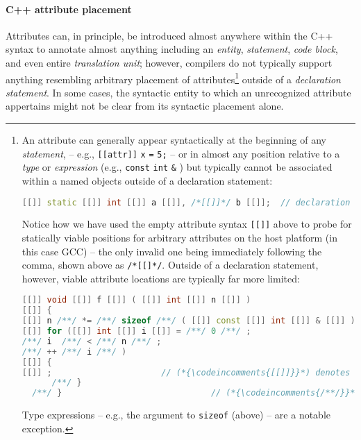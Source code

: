 \documentclass[twoside,10pt,letterpaper,usenames]{newstyle-PearsonGeneric-7-38}
\newcommand{\codeincomments}{\color{skyblue}\ttfamily}
\begin{document}
\paragraph[C++ attribute placement]{C++ attribute placement}\label{c++-attribute-placement}

Attributes can, in principle, be introduced almost anywhere within the
C++ syntax to annotate almost anything including an \emph{entity},
\emph{statement}, \emph{code block}, and even entire \emph{translation
unit}; however, compilers do not typically support anything resembling
arbitrary placement of attributes{\cprotect\footnote{An attribute can
generally appear syntactically at the beginning of any
\emph{statement}, -- e.g., \texttt{[[attr]]} \texttt{x} \texttt{=}
\texttt{5;} -- or in almost any position relative to a \emph{type} or
\emph{expression} (e.g., \texttt{const} \texttt{int} \texttt{\&} ) but
typically cannot be associated within a named objects outside of a
declaration statement:

\begin{lstlisting}[language=C++, basicstyle={\ttfamily\footnotesize}]
[[]] static [[]] int [[]] a [[]], /*[[]]*/ b [[]];  // declaration statement
\end{lstlisting}


Notice how we have used the empty attribute syntax \texttt{[[]]} above
to probe for statically viable positions for arbitrary attributes on
the host platform (in this case GCC) -- the only invalid one being
immediately following the comma, shown above as \texttt{/*[[]*/}.
Outside of a declaration statement, however, viable attribute
locations are typically far more limited:

\begin{lstlisting}[language=C++, basicstyle={\ttfamily\footnotesize}]
[[]] void [[]] f [[]] ( [[]] int [[]] n [[]] )
[[]] {
[[]] n /**/ *= /**/ sizeof /**/ ( [[]] const [[]] int [[]] & [[]] ) /**/;
[[]] for ([[]] int [[]] i [[]] = /**/ 0 /**/ ;
/**/ i  /**/ < /**/ n /**/ ;
/**/ ++ /**/ i /**/ )
[[]] {
[[]] ;                      // (*{\codeincomments{[[]]}}*) denotes viable attribute location
      /**/ }
  /**/ }                              // (*{\codeincomments{/**/}}*) denotes no attribute is allowed
  \end{lstlisting}
      

  Type expressions -- e.g., the argument to \texttt{sizeof} (above) --
  are a notable exception.}} outside of a \emph{declaration statement}.
In some cases, the syntactic entity to which an unrecognized attribute
appertains might not be clear from its syntactic placement alone.
\end{document}
